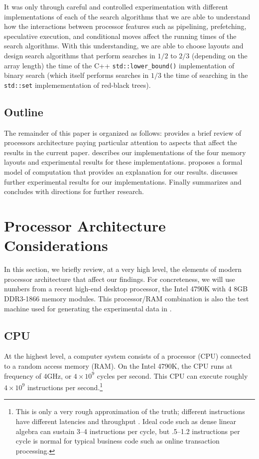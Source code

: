 \documentclass{patmorin}
\begin{document}
It was only through careful and controlled experimentation with
different implementations of each of the search algorithms that
we are able to understand how the interactions between processor
features such as pipelining, prefetching, speculative execution, and
conditional moves affect the running times of the search algorithms.
With this understanding, we are able to choose layouts and design search
algorithms that perform searches in $1/2$ to $2/3$ (depending on the
array length) the time of the C++ \texttt{std::lower_bound()}
implementation of binary search (which itself performs searches in $1/3$
the time of searching in the \texttt{std::set} implemementation of
red-black trees).

\subsection{Outline}

The remainder of this paper is organized as follows: 
provides a brief review of processors architecture paying particular
attention to aspects that affect the results in the current paper.
 describes our implementations of the four memory layouts
and experimental results for these implementations. 
proposes a formal model of computation that provides an explanation for
our results.   discusses further experimental results
for our implementations.  Finally  summarizes and
concludes with directions for further research.

\section{Processor Architecture Considerations}

In this section, we briefly review, at a very high level, the elements of
modern processor architecture that affect our findings.  For concreteness,
we will use numbers from a recent high-end desktop processor, the
Intel 4790K \cite{intel:4790k} with 4 8GB DDR3-1866 memory modules.
This processor/RAM combination is also the test machine used for
generating the experimental data in .

\subsection{CPU}

At the highest level, a computer system consists of a processor (CPU)
connected to a random access memory (RAM). On the Intel 4790K, the
CPU runs at frequency of 4GHz, or $4\times10^9$ cycles per second.
This CPU can execute roughly $4\times 10^{9}$ instructions per
second.\footnote{This is only a very rough approximation of the
truth; different instructions have different latencies and throughput
\cite{fog:instruction}.  Ideal code such as dense linear algebra
can sustain 3--4 instructions per cycle, but .5--1.2 instructions per cycle
is normal for typical business code such as online transaction processing.}
\end{document}
